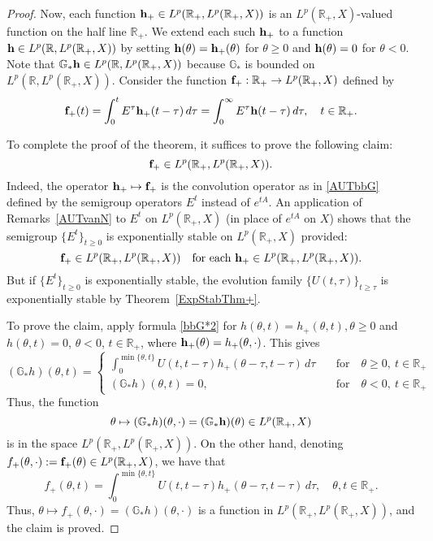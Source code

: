 \documentclass[10pt,psamsfonts,leqno]{siamltex}
\newcommand{\bbR}{\mathbb{R}}
\newcommand{\bbG}{\mathbb{G}}
\begin{document}
\begin{proof}
Now, each function ${\bf h}_+\in L^p(\bbR_+,L^p(\bbR_+,X))$ is
an $L^p(\bbR_+,X)$-valued function
on the half line $\bbR_+$. We extend each such ${\bf h}_+$ to a
function ${\bf h}\in L^p(\bbR,L^p(\bbR_+,X))$ by setting
${\bf h}(\theta)={\bf h}_+(\theta )$ for $\theta \geq 0$ and
${\bf h}(\theta)=0$ for $\theta <0$.
Note that $\bbG_*{\bf h}\in L^p(\bbR,L^p(\bbR_+,X))$ because
$\bbG_*$ is bounded on
$L^p(\bbR,L^p(\bbR_+,X))$.
Consider the function
${\bf f}_+:\bbR_+\to L^p(\bbR_+,X)$ defined by
$$
{\bf f}_+(t)=\int_0^t E^\tau{\bf h}_+(t
-\tau)\,d\tau=\int_0^\infty E^\tau{\bf h}(t-\tau)\,d\tau,
\quad t \in \bbR_+.
$$

\noindent To complete the proof of the theorem, it suffices to prove
the following claim:  $${\bf f}_+\in L^p(\bbR_+,L^p(\bbR_+,X)).$$
Indeed, the operator ${\bf h}_+\mapsto {\bf f}_+$
is the convolution operator as in
\eqref{AUTbbG} defined by the semigroup operators
$E^t$ instead of $e^{tA}$.
An application of Remarks~\ref{AUTvanN} to
$E^t$ on $L^p(\bbR_+,X)$ (in place of $e^{tA}$ on $X$)
shows that
the semigroup $\{E^t\}_{t\ge0}$ is exponentially stable
on $L^p(\bbR_+,X)$ provided:
\[
{\bf f}_+\in L^p(\bbR_+,L^p(\bbR_+,X)) \quad \text{for
each}\ {\bf h}_+\in L^p(\bbR_+,L^p(\bbR_+,X)).
\]
\noindent But if $\{E^t\}_{t\ge0}$ is exponentially stable,
the evolution family $\{U(t,\tau)\}_{t\ge\tau}$ is
exponentially stable by Theorem~\ref{ExpStabThm+}.

To prove the claim, apply formula \eqref{bbG*2} for
$h(\theta ,t )=h_+(\theta ,t  ),\theta \geq 0$ and
$h(\theta ,t  )=0$, $\theta <0$,
$t  \in \bbR_+$, where
${\bf h}_+(\theta )=h_+(\theta ,\cdot )$. This gives
$$
(\bbG_*h)(\theta ,t )=
\begin{cases}
\int^{\min \{\theta ,t \}}_0
U(t ,t -\tau)h_+(\theta-\tau,t  -\tau)\,d\tau \quad
&\text{for}\quad \theta\ge 0,\  t  \in \bbR_+\\
(\bbG_*h)(\theta ,t )=0,\quad
&\text{for}\quad \theta <0, \  t  \in \bbR_+
\end{cases}
$$
Thus, the function
$$
\theta \mapsto (\bbG_*h)(\theta ,\cdot)
   =(\bbG_*{\bf h})(\theta )\in L^p(\bbR_+,X)
$$
is in the space
$L^p(\bbR_+,L^p(\bbR_+,X))$.
On the other hand, denoting $f_+(\theta ,\cdot):={\bf f}_+(\theta)
\in L^p(\bbR_+,X)$, we have that
$$
f_+(\theta ,t  )=\int^{\min \{\theta ,t  \}}_0
U(t,t-\tau)h_+(\theta -\tau,t-\tau)\,d\tau,\quad
\theta ,t  \in \bbR_+.
$$
Thus, $\theta \mapsto f_+(\theta ,\cdot)
=(\bbG_*h)(\theta ,\cdot )$
is a function in $L^p(\bbR_+,L^p(\bbR_+,X))$,
and the claim is proved.
\end{proof}
\end{document}
